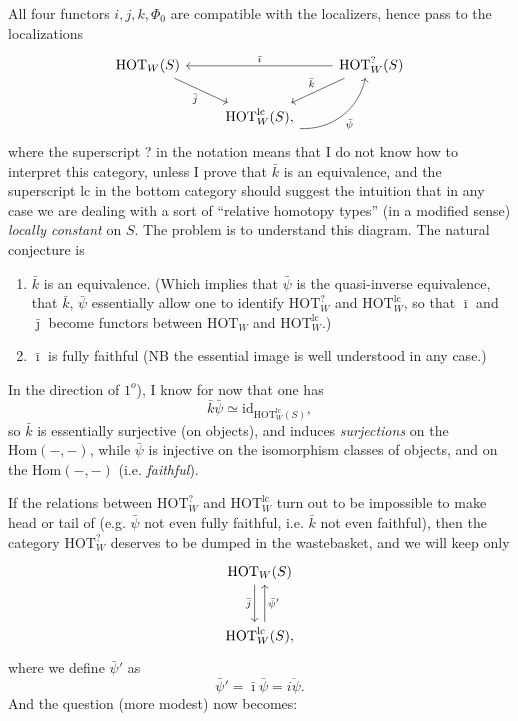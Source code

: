 \documentclass[11pt]{article}
\newcommand{\printedpage}[1]{\marginpar{\footnotesize p.~#1}}
\newcommand{\msp}[1]{\marginpar{\footnotesize [#1]}}
\begin{document}
\msp{page 37}
All four functors $i, j, k, \Phi_0$ are compatible with the localizers, hence pass to the localizations
\printedpage{22}
\[
\begin{tikzcd}
\mathrm{HOT}_W(S) \arrow[dr, "\bar{j}"'] & & \mathrm{HOT}^{?}_W(S) \arrow[ll, "\bar{\imath}"'] \arrow[dl, "\bar{k}"'] \\
& \mathrm{HOT}^{\mathrm{lc}}_W(S), \arrow[ur, bend right=40, "\bar{\psi}"'] &
\end{tikzcd}
\]
where the superscript ? in the notation means that I do not know how to interpret this category, unless I prove that $\bar{k}$ is an equivalence, and the superscript lc in the bottom category should suggest the intuition that in any case we are dealing with a sort of ``relative homotopy types'' (in a modified sense) \textit{locally constant} on $S$. The problem is to understand this diagram. The natural conjecture is %

\begin{enumerate}[leftmargin=*]
\item[$1^o$)] $\bar{k}$ is an equivalence. (Which implies that $\bar{\psi}$ is the quasi-inverse equivalence, that $\bar{k}$, $\bar{\psi}$ essentially allow one to identify $\mathrm{HOT}^{?}_W$ and $\mathrm{HOT}^{\mathrm{lc}}_W$, so that $\bar{\imath}$ and $\bar{\jmath}$ become functors between $\mathrm{HOT}_W$ and $\mathrm{HOT}^{\mathrm{lc}}_W$.)

\item[$2^o$)] $\bar{\imath}$ is fully faithful (NB the essential image is well understood in any case.)
\end{enumerate}

\msp{page 38}
In the direction of $1^o$), I know for now that one has
\[
\bar{k}\bar{\psi} \simeq \mathrm{id}_{\mathrm{HOT}^{\mathrm{lc}}_W(S)},
\]
so $\bar{k}$ is essentially surjective (on objects), and induces \textit{surjections} on the $\mathrm{Hom}(-,-)$, while $\bar{\psi}$ is injective on the isomorphism classes of objects, and on the $\mathrm{Hom}(-,-)$ (i.e. \textit{faithful}).

If the relations between $\mathrm{HOT}^{?}_W$ and $\mathrm{HOT}^{\mathrm{lc}}_W$ turn out to be impossible to make head or tail of (e.g. $\bar{\psi}$ not even fully faithful, i.e. $\bar{k}$ not even faithful), then the category $\mathrm{HOT}^{?}_W$ deserves to be dumped in the wastebasket, and we will keep only
\[
\begin{tikzcd}[row sep=large]
\mathrm{HOT}_W(S) \arrow[d, shift right=1.5, "\bar{j}"'] \\
\mathrm{HOT}^{\mathrm{lc}}_W(S), \arrow[u, shift right=1.5, "\bar{\psi}'"']
\end{tikzcd}
\]
where we define $\bar{\psi}'$ as
\[
\bar{\psi}' = \bar{\imath}\bar{\psi} = \overline{i\psi}.
\]
And the question (more modest) now becomes:
\end{document}
